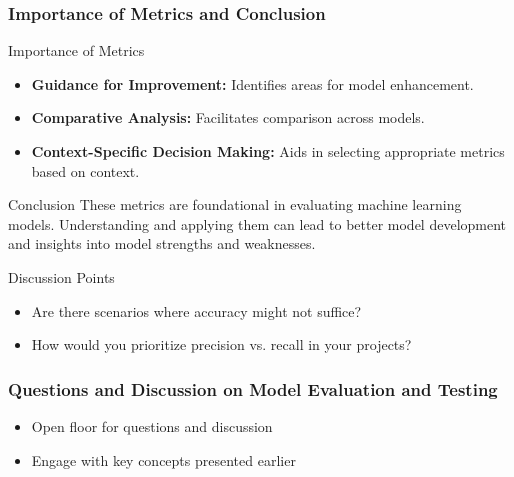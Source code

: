 \documentclass[aspectratio=169]{beamer}
\begin{document}
\begin{frame}[fragile]
    \frametitle{Importance of Metrics and Conclusion}
    \begin{block}{Importance of Metrics}
        \begin{itemize}
            \item \textbf{Guidance for Improvement:} Identifies areas for model enhancement.
            \item \textbf{Comparative Analysis:} Facilitates comparison across models.
            \item \textbf{Context-Specific Decision Making:} Aids in selecting appropriate metrics based on context.
        \end{itemize}
    \end{block}

    \begin{block}{Conclusion}
        These metrics are foundational in evaluating machine learning models. 
        Understanding and applying them can lead to better model development and insights into model strengths and weaknesses.
    \end{block}

    \begin{block}{Discussion Points}
        \begin{itemize}
            \item Are there scenarios where accuracy might not suffice?
            \item How would you prioritize precision vs. recall in your projects?
        \end{itemize}
    \end{block}
\end{frame}

\begin{frame}[fragile]
    \frametitle{Questions and Discussion on Model Evaluation and Testing}
    \begin{itemize}
        \item Open floor for questions and discussion
        \item Engage with key concepts presented earlier
    \end{itemize}
\end{frame}
\end{document}
